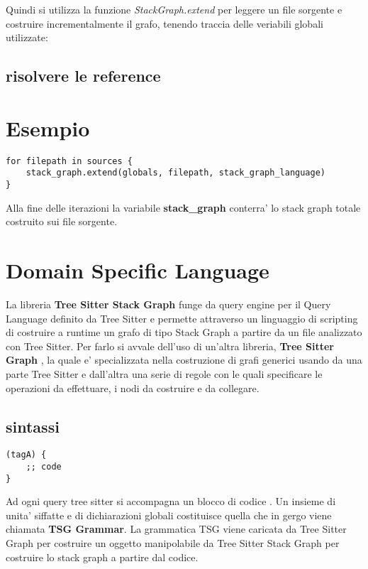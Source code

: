 Quindi si utilizza la funzione \emph{StackGraph.extend} per leggere un file sorgente e costruire incrementalmente il grafo, tenendo traccia delle veriabili globali utilizzate:

\subsection{risolvere le reference}

\section{Esempio}

\begin{Verbatim}[samepage=true]
for filepath in sources {
    stack_graph.extend(globals, filepath, stack_graph_language)
}
\end{Verbatim}

Alla fine delle iterazioni la variabile \textbf{stack\_graph} conterra' lo stack graph totale costruito sui file sorgente.

\section{Domain Specific Language}

La libreria \textbf{Tree Sitter Stack Graph} \cite{TreeSitterStackGraph} funge da query engine per il Query Language definito da Tree Sitter e permette attraverso un linguaggio di scripting di costruire a runtime un grafo di tipo Stack Graph a partire da un file analizzato con Tree Sitter.
Per farlo si avvale dell'uso di un'altra libreria, \textbf{Tree Sitter Graph} \cite{TreeSitterGraph}, la quale e' specializzata nella costruzione di grafi generici usando da una parte Tree Sitter e dall'altra una serie di regole con le quali specificare le operazioni da effettuare, i nodi da costruire e da collegare.

\subsection{sintassi}

\begin{Verbatim}[samepage=true]
(tagA) {
    ;; code
}
\end{Verbatim}

Ad ogni query tree sitter si accompagna un blocco di codice \cite{TreeSitterGraphReferenceHighLevelStructure}.
Un insieme di unita' siffatte e di dichiarazioni globali costituisce quella che in gergo viene chiamata \textbf{TSG Grammar}.
La grammatica TSG viene caricata da Tree Sitter Graph per costruire un oggetto manipolabile da Tree Sitter Stack Graph per costruire lo stack graph a partire dal codice.

